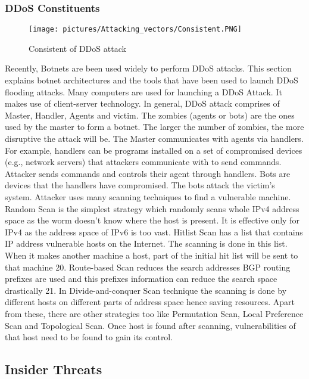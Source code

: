 \documentclass[twocolumn]{article}
\begin{document}
\subsubsection{DDoS Constituents}
\begin{figure}[H]
    \centering
    \texttt{[image: pictures/Attacking\_vectors/Consistent.PNG]}
    \caption{Consistent of DDoS attack}
    \label{fig:consistnt}
\end{figure}
Recently, Botnets are been used widely to perform DDoS attacks. This section explains botnet architectures and
the tools that have been used to launch DDoS flooding attacks. Many computers are used for launching a DDoS
Attack. It makes use of client-server technology. In general, DDoS attack comprises of Master, Handler, Agents and
victim. The zombies (agents or bots) are the ones used by the master to form a botnet. The larger the number of zombies, the more disruptive the attack will be. The Master communicates with agents via handlers. For example, handlers can be programs installed on a set of compromised devices (e.g., network servers) that attackers communicate with to send commands. Attacker sends commands and controls their agent through handlers. Bots are
devices that the handlers have compromised.
The bots attack the victim’s system. Attacker uses many scanning techniques to find a vulnerable machine.
Random Scan is the simplest strategy which randomly scans whole IPv4 address space as the worm doesn’t know
where the host is present. It is effective only for IPv4 as the address space of IPv6 is too vast. Hitlist Scan has a
list that contains IP address vulnerable hosts on the Internet. The scanning is done in this list. When it makes
another machine a host, part of the initial hit list will be sent to that machine 20. Route-based Scan reduces the search
addresses BGP routing prefixes are used and this prefixes information can reduce the search space drastically 21. In
Divide-and-conquer Scan technique the scanning is done by different hosts on different parts of address space hence
saving resources. Apart from these, there are other strategies too like Permutation Scan, Local Preference Scan
and Topological Scan. Once host is found after scanning, vulnerabilities of that host need to be found to gain its
control\cite{deshmukh2015understanding}. 
\subsection{Insider Threats}
\end{document}
